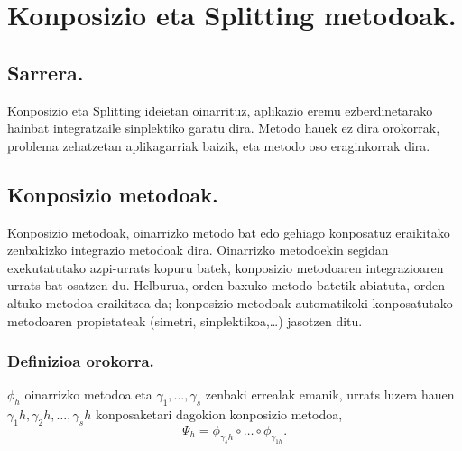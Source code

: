 \section{Konposizio eta Splitting metodoak.}

\subsection{Sarrera.}

Konposizio eta Splitting ideietan oinarrituz, aplikazio eremu ezberdinetarako hainbat integratzaile sinplektiko garatu dira. Metodo hauek ez dira orokorrak, problema zehatzetan aplikagarriak baizik, eta metodo oso eraginkorrak dira.  

\subsection{Konposizio metodoak.}

Konposizio metodoak, oinarrizko metodo bat edo gehiago konposatuz eraikitako zenbakizko integrazio metodoak dira.  Oinarrizko metodoekin segidan exekutatutako azpi-urrats kopuru batek, konposizio metodoaren integrazioaren urrats bat osatzen du. Helburua, orden baxuko metodo batetik abiatuta, orden altuko metodoa eraikitzea da; konposizio metodoak automatikoki konposatutako metodoaren propietateak (simetri, sinplektikoa,\dots) jasotzen ditu. 

\subsubsection*{Definizioa orokorra.}
$\phi_h$ oinarrizko metodoa eta $\gamma_1,\dots,\gamma_s$ zenbaki errealak emanik, urrats luzera hauen $\gamma_1 h,\gamma_2 h,\dots,\gamma_s h$ konposaketari dagokion konposizio metodoa,
\begin{equation}
\Psi_h=\phi_{\gamma_s h} \circ \dots \circ \phi_{\gamma_{1 h}}.
\end{equation}


